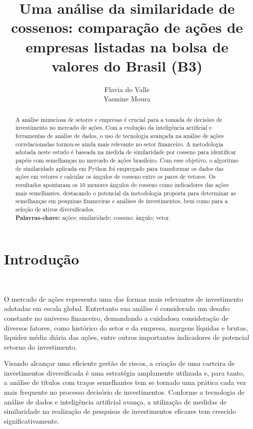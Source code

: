 \documentclass[12pt, a4paper]{article}
\title{\textbf{Uma análise da similaridade de cossenos: comparação de ações de empresas listadas na bolsa de valores do Brasil (B3)}}
\author{ Flavia do Valle\\Yasmine Moura}
\date{}
\begin{document}
\maketitle

\begin{abstract}
A análise minuciosa de setores e empresas é crucial para a tomada de decisões de investimento no mercado de ações.  Com a evolução da inteligência artificial e ferramentas de análise de dados,  o uso de tecnologia avançada na análise de ações correlacionadas tornou-se ainda mais relevante no setor financeiro. A metodologia adotada neste estudo é baseada na medida de similaridade por cosseno para identificar papéis com semelhanças no mercado de ações brasileiro. Com esse objetivo, o algoritmo de similaridade aplicada em Python foi empregado para transformar os dados das ações em vetores e calcular os ângulos de cosseno entre os pares de vetores. Os resultados apontaram os 10 menores ângulos de cosseno como indicadores das ações mais semelhantes, destacando o potencial da metodologia proposta para determinar as semelhanças em pesquisas financeiras e análises de investimentos, bem como para a seleção de ativos diversificados.\\
\textbf {Palavras-chave:} ações; similaridade; cosseno; ângulo; vetor.\\
\end{abstract}

\section{Introdução}\

O mercado de ações representa uma das formas mais relevantes de investimento adotadas em escala global. Entretanto sua análise é considerada um desafio constante no universo financeiro, demandando a cuidadosa consideração de diversos fatores, como histórico do setor e da empresa, margens líquidas e brutas, liquidez média diária das ações, entre outros importantes indicadores de potencial retorno do investimento.\

Visando alcançar uma eficiente gestão de riscos, a criação de uma carteira de investimentos diversificada é uma estratégia amplamente utilizada e, para tanto, a análise de títulos com traços semelhantes tem se tornado uma prática cada vez mais frequente no processo decisório de investimentos. Conforme a tecnologia de análise de dados e inteligência artificial avança, a utilização de medidas de similaridade na realização de pesquisas de investimentos eficazes tem crescido significativamente.\\
\end{document}
